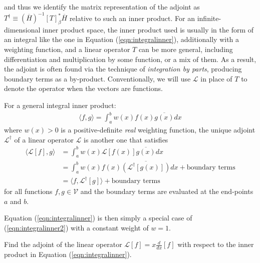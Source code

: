 and thus we identify the matrix representation of the adjoint as $T^\dag \equiv (\overline{H})^{-1} [T]_\beta^* \overline{H}$ relative to such an inner product. For an infinite-dimensional inner product space, the inner product used is usually in the form of an integral like the one in Equation (\ref{eqn:integralinner}), additionally with a weighting function, and a linear operator $T$ can be more general, including differentiation and multiplication by some function, or a mix of them. As a result, the adjoint is often found via the technique of \textit{integration by parts}, producing boundary terms as a by-product. Conventionally, we will use $\mathcal{L}$ in place of $T$ to denote the operator when the vectors are functions.
\begin{proper}
\label{proper:adjointinnerint}
For a general integral inner product:
\begin{align}
\langle f,g \rangle = \int_a^b w(x) f(x) \overline{g(x)} dx \label{eqn:integralinner2}
\end{align}
where $w(x) > 0$ is a positive-definite \textit{real} weighting function, the unique adjoint $\mathcal{L}^\dagger$ of a linear operator $\mathcal{L}$ is another one that satisfies
\begin{align*}
\langle \mathcal{L}[f], g \rangle &= \int_a^b w(x) \mathcal{L}[f(x)] \overline{g(x)} dx \\ 
&= \int_a^b w(x) f(x) \overline{(\mathcal{L^\dag}[g(x)])} dx + \text{boundary terms} \\
&= \langle f, \mathcal{L}^\dag[g] \rangle + \text{boundary terms}
\end{align*}
for all functions $f, g \in \mathcal{V}$ and the boundary terms are evaluated at the end-points $a$ and $b$.
\end{proper}
Equation (\ref{eqn:integralinner}) is then simply a special case of (\ref{eqn:integralinner2}) with a constant weight of $w = 1$.
\begin{exmp}
Find the adjoint of the linear operator $\mathcal{L}[f] = x\frac{d}{dx}[f]$ with respect to the inner product in Equation (\ref{eqn:integralinner}).
\end{exmp}
